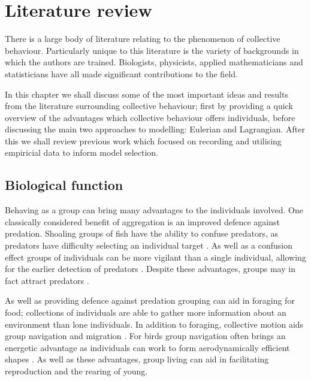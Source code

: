 \graphicspath{{fig/lit_review/}}

\chapter{Literature review}
\label{cha:lit_review}

There is a large body of literature relating to the phenomenon of collective behaviour. Particularly unique to this literature is the variety of backgrounds in which the authors are trained. Biologists, physicists, applied mathematicians and statisticians have all made significant contributions to the field.

In this chapter we shall discuss some of the most important ideas and results from the literature surrounding collective behaviour; first by providing a quick overview of the advantages which collective behaviour offers individuals, before discussing the main two approaches to modelling: Eulerian and Lagrangian. After this we shall review previous work which focused on recording and utilising empiricial data to inform model selection.

\section{Biological function}
\label{sec:biological_function}

Behaving as a group can bring many advantages to the individuals involved. One classically considered  benefit of aggregation is an improved defence against predation. Shoaling groups of fish have the ability to confuse predators, as predators have difficulty selecting an individual target \parencite{landeau86}. As well as a confusion effect groups of individuals can be more vigilant than a single individual, allowing for the earlier detection of predators \parencite{pitcher93}. Despite these advantages, groups may in fact attract predators \parencite{wittenberger85}.

As well as providing defence against predation grouping can aid in foraging for food; collections of individuals are able to gather more information about an environment than lone individuals. In addition to foraging, collective motion aids group navigation and migration \parencite{simmons04}. For birds group navigation often brings an energetic advantage as individuals can work to form aerodynamically efficient shapes \parencite{weimerskirch01}. As well as these advantages, group living can aid in facilitating reproduction and the rearing of young.

